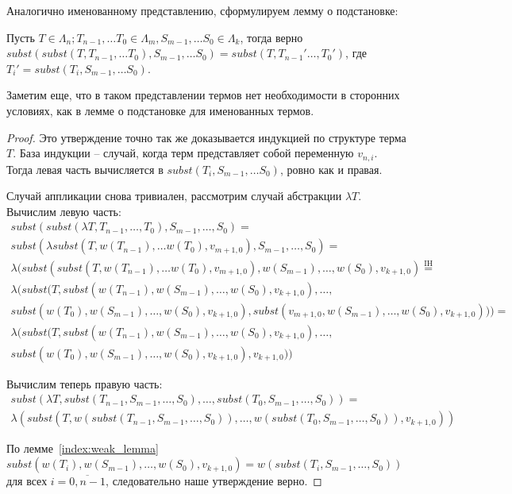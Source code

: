 Аналогично именованному представлению, сформулируем лемму о подстановке:

\begin{prop}
  \label{index:assoc}
  Пусть $T \in \Lambda_{n}; T_{n - 1}, \dots T_{0} \in \Lambda_{m}, S_{m-1}, \dots S_{0} \in \Lambda_{k}$, тогда верно $subst(subst(T, T_{n - 1}, \dots T_{0}), S_{m-1}, \dots S_{0}) = subst(T, T_{n - 1}' \dots, T_{0}')$, где $T_{i}' = subst(T_{i}, S_{m-1}, \dots S_{0})$.
\end{prop}

Заметим еще, что в таком представлении термов нет необходимости в сторонних условиях, как в лемме о подстановке для именованных термов.

\begin{proof}
  Это утверждение точно так же доказывается индукцией по структуре терма $T$. База индукции -- случай, когда терм представляет собой переменную $v_{n, i}$. Тогда левая часть вычисляется в $subst(T_{i}, S_{m-1}, \dots S_{0})$, ровно как и правая.

  Случай аппликации снова тривиален, рассмотрим случай абстракции $\lambda T$. Вычислим левую часть:
  \begin{gather*}
    subst(subst(\lambda T, T_{n-1}, \dots, T_{0}), S_{m-1}, \dots, S_{0}) = \\
    subst(\lambda subst( T, w(T_{n - 1}), \dots w(T_{0}), v_{m+1, 0} ), S_{m - 1}, \dots, S_{0}) = \\
    \lambda(subst(subst( T, w(T_{n - 1}), \dots w(T_{0}), v_{m+1, 0} ), w(S_{m-1}), \dots, w(S_{0}), v_{k+1, 0}) \overset{\mathrm{IH}}{=} \\
    \lambda(subst(T, subst(w(T_{n-1}), w(S_{m-1}), \dots, w(S_{0}), v_{k+1, 0}), \dots, \\
    subst(w(T_{0}), w(S_{m-1}), \dots, w(S_{0}), v_{k+1, 0}), subst(v_{m+1, 0}, w(S_{m-1}), \dots, w(S_{0}), v_{k+1, 0}))) = \\
    \lambda(subst(T, subst(w(T_{n-1}), w(S_{m-1}), \dots, w(S_{0}), v_{k+1, 0}), \dots, \\
    subst(w(T_{0}), w(S_{m-1}), \dots, w(S_{0}), v_{k+1, 0}), v_{k+1, 0}))
  \end{gather*}

  Вычислим теперь правую часть:
  \begin{gather*}
    subst(\lambda T, subst(T_{n-1}, S_{m - 1}, \dots, S_{0}), \dots, subst(T_{0}, S_{m - 1}, \dots, S_{0})) = \\
    \lambda(subst(T, w(subst(T_{n-1}, S_{m - 1}, \dots, S_{0})), \dots, w(subst(T_{0}, S_{m - 1}, \dots, S_{0})), v_{k+1, 0}))
  \end{gather*}

  По лемме~\ref{index:weak_lemma} $subst(w(T_{i}), w(S_{m-1}), \dots, w(S_{0}), v_{k+1, 0}) = w(subst(T_{i}, S_{m - 1}, \dots, S_{0}))$ для всех $i=\overline{0, n-1}$, следовательно наше утверждение верно.
\end{proof}
